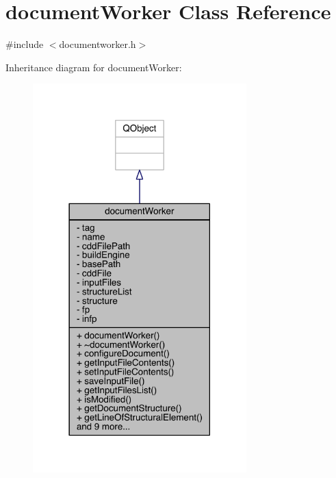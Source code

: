 \hypertarget{classdocument_worker}{\section{document\+Worker Class Reference}
\label{classdocument_worker}
}


{\ttfamily \#include $<$documentworker.\+h$>$}



Inheritance diagram for document\+Worker\+:\nopagebreak
\begin{figure}[H]
\begin{center}
\leavevmode
\includegraphics[width=234pt]{classdocument_worker__inherit__graph}
\end{center}
\end{figure}


